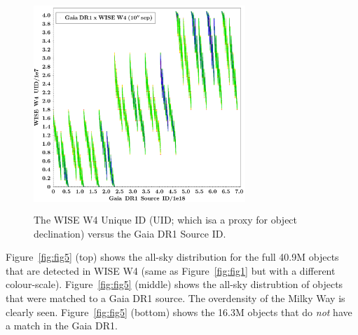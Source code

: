 \documentclass[usenatbib]{mn2e}
\begin{document}
\begin{figure}
    \centering
    \includegraphics[height=8.0cm,width=8.0cm]
    {../../Gaia/plots/Gaia_sourceID_vs_WW4C_uid.png}
    \caption[The WISE W4 Unique ID (UID; which isa a proxy for object declination) versus the Gaia DR1 Source ID.]
    {The WISE W4 Unique ID (UID; which isa a proxy for object declination) versus the Gaia DR1 Source ID.}                    
    \label{fig:fig4}
\end{figure}



Figure~\ref{fig:fig5} (top) shows the all-sky distribution for the
full 40.9M objects that are detected in WISE W4 (same as
Figure~\ref{fig:fig1} but with a different
colour-scale). Figure~\ref{fig:fig5} (middle) shows the all-sky distrubtion of 
objects that were matched to a Gaia DR1 source. The overdensity of the Milky 
Way is clearly seen. Figure~\ref{fig:fig5} (bottom) shows the 16.3M objects 
that do {\it not} have a match in the Gaia DR1. 
\end{document}
